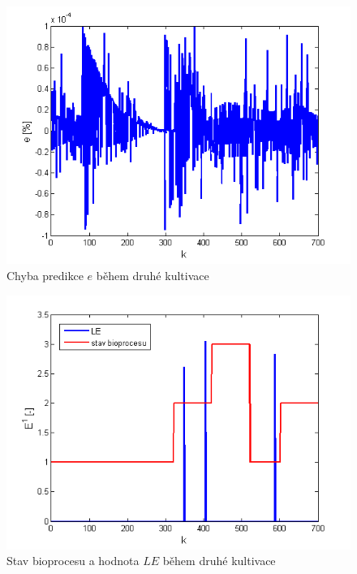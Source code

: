 \begin{figure}
    \centering
    \includegraphics[scale=0.8]{IMG/artep/artep17_5.png}
    \caption{Chyba predikce $e$ během druhé kultivace}
    \label{fig:artep_4}
\end{figure}

\begin{figure}
    \centering
    \includegraphics[scale=0.8]{IMG/artep/artep17_6.png}
    \caption{Stav bioprocesu a hodnota $LE$ během druhé kultivace}
    \label{fig:artep_6}
\end{figure}




 